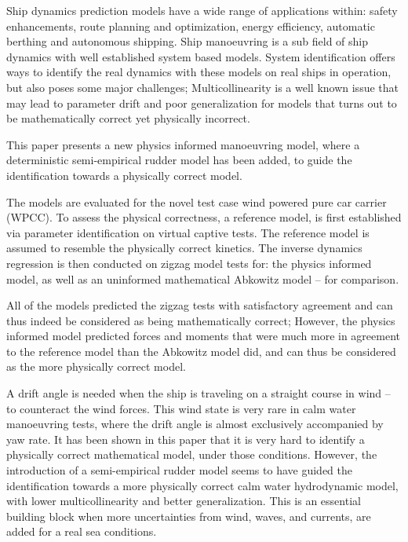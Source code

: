 Ship dynamics prediction models have a wide range of applications within: safety enhancements, route planning and optimization, energy efficiency, automatic berthing and autonomous shipping.
Ship manoeuvring is a sub field of ship dynamics with well established system based models.
System identification offers ways to identify the real dynamics with these models on real ships in operation, but also poses some major challenges;
Multicollinearity is a well known issue that may lead to parameter drift and poor generalization for models that turns out to be  mathematically correct yet physically incorrect.

This paper presents a new physics informed manoeuvring model, where a deterministic semi-empirical rudder model has been added, to guide the identification towards a physically correct model. 

The models are evaluated for the novel test case wind powered pure car carrier (WPCC).
To assess the physical correctness, a reference model, is first established via parameter identification on virtual captive tests. The reference model is assumed to resemble the physically correct kinetics.  
The inverse dynamics regression is then conducted on zigzag model tests for: the physics informed model, as well as an uninformed mathematical Abkowitz model -- for comparison. 

All of the models predicted the zigzag tests with satisfactory agreement and can thus indeed be considered as being mathematically correct; However, the physics informed model predicted forces and moments that were much more in agreement to the reference model than the Abkowitz model did, and can thus be considered as the more physically correct model. 

A drift angle is needed when the ship is traveling on a straight course in wind -- to counteract the wind forces. This wind state is very rare in calm water manoeuvring tests, where the drift angle is almost exclusively accompanied by yaw rate. It has been shown in this paper that it is very hard to identify a physically correct mathematical model, under those conditions.
However, the introduction of a semi-empirical rudder model seems to have guided the identification towards a more physically correct calm water hydrodynamic model, with lower multicollinearity and better generalization. This is an essential building block when more uncertainties from wind, waves, and currents, are added for a real sea conditions.